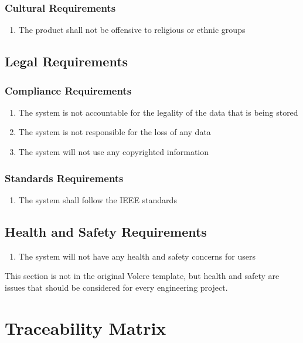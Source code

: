 \documentclass[12pt, titlepage]{article}
\begin{document}
	\subsubsection{Cultural Requirements}
	\begin{enumerate}[resume*]
		\item The product shall not be offensive to religious or ethnic groups
	\end{enumerate}
	\subsection{Legal Requirements}
	\subsubsection{Compliance Requirements}
	\begin{enumerate}[resume*]
		\item The system is not accountable for the legality of the data that is being stored
		\item The system is not responsible for the loss of any data
		\item The system will not use any copyrighted information
	\end{enumerate}
	\subsubsection{Standards Requirements}
	\begin{enumerate}[resume*]
		\item The system shall follow the IEEE standards
	\end{enumerate}
	\subsection{Health and Safety Requirements}
	\begin{enumerate}[resume*]
		\item The system will not have any health and safety concerns for users 
	\end{enumerate}
	This section is not in the original Volere template, but health and safety are
	issues that should be considered for every engineering project.
	
	\section{Traceability Matrix}
	
\end{document}
